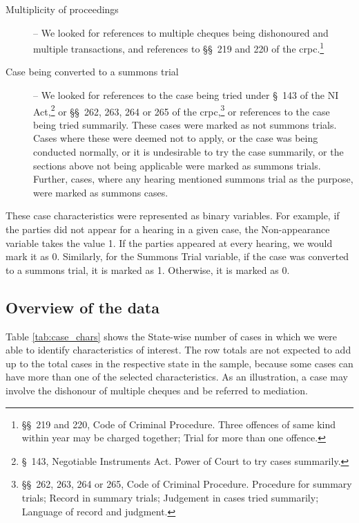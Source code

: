\documentclass[12pt,a4paper]{article}
\begin{document}
\begin{description}
\item[]

\item [Multiplicity of proceedings] -- We looked for references to multiple cheques being dishonoured and multiple transactions, and references to \S\S~219 and 220 of the \gls{crpc}.\footnote{\S\S~219 and 220, Code of Criminal Procedure. Three offences of same kind within year may be charged together; Trial for more than one offence.}

\item[]

\item [Case being converted to a summons trial] -- We looked for references to the case being tried under \S~143 of the NI Act,\footnote{\S~143, Negotiable Instruments Act. Power of Court to try cases summarily.} or \S\S~262, 263, 264 or 265 of the \gls{crpc},\footnote{\S\S~262, 263, 264 or 265, Code of Criminal Procedure. Procedure for summary trials; Record in summary trials; Judgement in cases tried summarily; Language of record and judgment.} or references to the case being tried summarily. These cases were marked as not summons trials. Cases where these were deemed not to apply, or the case was being conducted normally, or it is undesirable to try the case summarily, or the sections above not being applicable were marked as summons trials. Further, cases, where any hearing mentioned summons trial as the purpose, were marked as summons cases.

\end{description}

These case characteristics were represented as binary variables. For example, if the parties did not appear for a hearing in a given case, the Non-appearance variable takes the value 1. If the parties appeared at every hearing, we would mark it as 0. Similarly, for the Summons Trial variable, if the case was converted to a summons trial, it is marked as 1. Otherwise, it is marked as 0.

\subsection{Overview of the data}
\label{sec:overview-data}

Table \ref{tab:case_chars} shows the State-wise number of cases in which we were able to identify characteristics of interest. The row totals are not expected to add up to the total cases in the respective state in the sample, because some cases can have more than one of the selected characteristics. As an illustration, a case may involve the dishonour of multiple cheques and be referred to mediation.
\end{document}
